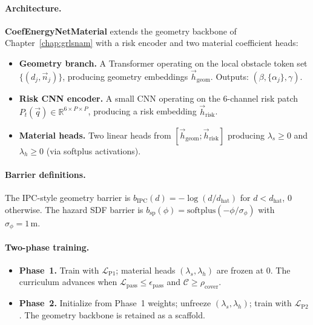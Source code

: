 \paragraph{Architecture.}
\textbf{CoefEnergyNetMaterial} extends the geometry backbone of
Chapter~\ref{chap:grlsnam} with a risk encoder and two material
coefficient heads:
\begin{itemize}
  \item \textbf{Geometry branch.}
        A Transformer operating on the local obstacle token set
        $\{(d_j, \vec{n}_j)\}$, producing geometry embeddings
        $\vec{h}_{\mathrm{geom}}$.
        Outputs: $(\beta, \{\alpha_j\}, \gamma)$.
  \item \textbf{Risk CNN encoder.}
        A small CNN operating on the $6$-channel risk patch
        $P_t(\vec{q}) \in \mathbb{R}^{6\times P\times P}$,
        producing a risk embedding $\vec{h}_{\mathrm{risk}}$.
  \item \textbf{Material heads.}
        Two linear heads from $[\vec{h}_{\mathrm{geom}}; \vec{h}_{\mathrm{risk}}]$
        producing $\lambda_s \geq 0$ and $\lambda_h \geq 0$
        (via softplus activations).
\end{itemize}

\paragraph{Barrier definitions.}
The IPC-style geometry barrier is
$b_{\mathrm{IPC}}(d) = -\log(d/d_{\mathrm{hat}})$ for $d < d_{\mathrm{hat}}$,
$0$ otherwise.
The hazard SDF barrier is
$b_{\mathrm{sp}}(\phi) = \mathrm{softplus}(-\phi/\sigma_\phi)$
with $\sigma_\phi = 1\,\text{m}$.

\paragraph{Two-phase training.}
\begin{itemize}
  \item \textbf{Phase~1.}
        Train with $\mathcal{L}_{\mathrm{P1}}$; material heads
        $(\lambda_s, \lambda_h)$ are frozen at $0$.
        The curriculum advances when $\mathcal{L}_{\mathrm{pass}}
        \leq \epsilon_{\mathrm{pass}}$ and
        $\mathcal{C} \geq \rho_{\mathrm{cover}}$.
  \item \textbf{Phase~2.}
        Initialize from Phase~1 weights; unfreeze
        $(\lambda_s, \lambda_h)$; train with $\mathcal{L}_{\mathrm{P2}}$.
        The geometry backbone is retained as a scaffold.
\end{itemize}

